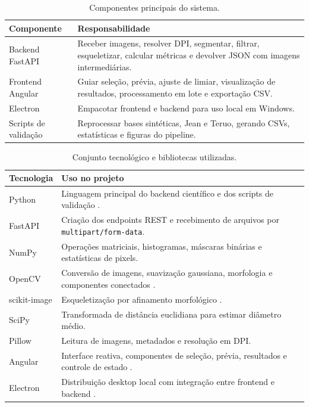 \documentclass[12pt]{article}
\begin{document}
\begin{table}[!htbp]
\centering
\caption{Componentes principais do sistema.}
\label{tab:arquitetura}
\begin{tabular}{p{3.2cm}p{10.5cm}}
\toprule
Componente & Responsabilidade \\
\midrule
Backend FastAPI & Receber imagens, resolver DPI, segmentar, filtrar, esqueletizar, calcular métricas e devolver JSON com imagens intermediárias. \\
Frontend Angular & Guiar seleção, prévia, ajuste de limiar, visualização de resultados, processamento em lote e exportação CSV. \\
Electron & Empacotar frontend e backend para uso local em Windows. \\
Scripts de validação & Reprocessar bases sintéticas, Jean e Teruo, gerando CSVs, estatísticas e figuras do pipeline. \\
\bottomrule
\end{tabular}
\end{table}

\vspace{5mm}

\begin{table}[!htbp]
\centering
\caption{Conjunto tecnológico e bibliotecas utilizadas.}
\label{tab:stack}
\begin{tabular}{p{3.4cm}p{10.3cm}}
\toprule
Tecnologia & Uso no projeto \\
\midrule
Python \cite{python2026} & Linguagem principal do backend científico e dos scripts de validação . \\
FastAPI \cite{fastapi2026} & Criação dos endpoints REST e recebimento de arquivos por \texttt{multipart/form-data}. \\
NumPy \cite{harris2020array} & Operações matriciais, histogramas, máscaras binárias e estatísticas de pixels. \\
OpenCV \cite{bradski2000opencv} & Conversão de imagens, suavização gaussiana, morfologia e componentes conectados . \\
scikit-image \cite{vanderwalt2014skimage} & Esqueletização por afinamento morfológico . \\
SciPy \cite{virtanen2020scipy} & Transformada de distância euclidiana para estimar diâmetro médio. \\
Pillow \cite{clark2015pillow} & Leitura de imagens, metadados e resolução em DPI. \\
Angular \cite{angular2026} & Interface reativa, componentes de seleção, prévia, resultados e controle de estado . \\
Electron \cite{electron2026} & Distribuição desktop local com integração entre frontend e backend . \\
\bottomrule
\end{tabular}
\end{table}
\end{document}
